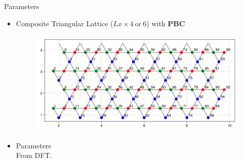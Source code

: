 \documentclass{beamer}
\begin{document}
\begin{frame}{Parameters}
		\begin{itemize}
			\item Composite Triangular Lattice ($Lx\times 4\ \text{or}\ 6$) with \textbf{PBC}
			\begin{figure}[H]
				\includegraphics[width=0.8\linewidth]{figures/8x4Kagome.png}
			\end{figure}
			\item Parameters\\
			From DFT.
		\end{itemize}
\end{frame}
\end{document}
